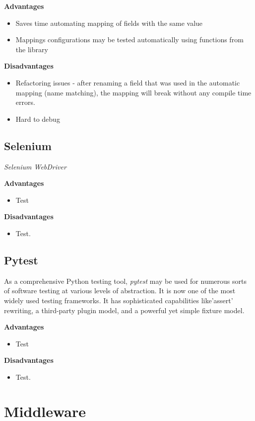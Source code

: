 \textbf{Advantages}
\begin{itemize}
    \item Saves time automating mapping of fields with the same value
    \item Mappings configurations may be tested automatically using functions from the library
\end{itemize}
\textbf{Disadvantages}
\begin{itemize}
    \item Refactoring issues - after renaming a field that was used in the automatic mapping (name matching), the mapping will break without any compile time errors.
    \item Hard to debug
\end{itemize}

\subsection{Selenium}

\textit{Selenium WebDriver} \cite{selenium}


\textbf{Advantages}
\begin{itemize}
    \item Test
\end{itemize}

\textbf{Disadvantages}
\begin{itemize}
    \item Test.
\end{itemize}

\subsection{Pytest}


As a comprehensive Python testing tool, \textit{pytest} \cite{pytest} may be used for numerous sorts of software testing at various levels of abstraction. It is now one of the most widely used testing frameworks. It has sophisticated capabilities like'assert' rewriting, a third-party plugin model, and a powerful yet simple fixture model.

\textbf{Advantages}
\begin{itemize}
    \item Test
\end{itemize}

\textbf{Disadvantages}
\begin{itemize}
    \item Test.
\end{itemize}

\section{Middleware}
